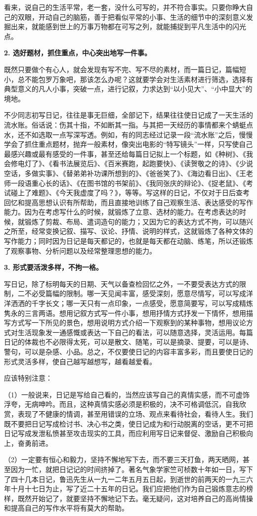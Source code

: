 看来，说自己的生活平常，老一套，没什么可写的，并不符合事实。只要你睁大自己的双眼，开动自己的脑筋，善于把看似平常的小事、生活的细节中的深刻意义发掘出来，就能感到世上的万事万物都在可写之列，就能捕捉到平凡生活中的闪光点。

\textbf{2. 选好题材，抓住重点，中心突出地写一件事。}

既然只要做个有心人，就会发现有写不完、写不尽的素材，而一篇日记，篇幅短小，总不能包罗万象吧，那该怎么办呢？这就要学会对生活素材进行筛选，选择有典型意义的凡人小事，突破一点，进行记叙，力求达到“以小见大”、“小中显大”的境地。

不少同志初写日记，往往是事无巨细，全部记下，结果往往使日记成了一天生活的流水账。俗话说：伤其十指，不如断其一指。与其把一天经历的事情都来个蜻蜓点水，还不如选取一点写深写透。例如，有的同志经过记录一段“流水账”之后，慢慢学会了抓住重点题材，抛弃一般素材，像突出电影的“特写镜头”一样，只写使自己最感兴趣或最有感受的一件事，甚至还给每篇日记拟上一个标题，如《种树》、《我会修电灯了》、《看书法展览后》、《百米赛跑，起跑要快》、《读贺敬之的诗》、《少说空话，多做实事》、《替弟弟补功课所想到的》、《爸爸笑了》、《海边看日出》、《王老师一段语重心长的话》、《在图书馆的书架前》、《我同张庆的辩论》、《捉老鼠》、《考试碰上了难题》、《今天我虚度了吗？》，等等。写这样的日记，不仅对于日后查考回忆和提高思想认识有所帮助，而且直接地训练了自己观察生活、表达感受的写作能力。因为在考虑写什么的时候，就锻炼了立意、选材的能力。在考虑表达的时候，就锻炼了剪裁、布局、遣词造句的能力；又因为它的表达方式不拘，可以随兴之所至，经常变换记叙、描写、议论、抒情、说明的样式，这就锻炼了各种文体的写作能力；同时因为日记是每天都记的，也就是每天都在动脑、练笔，所以还锻炼了观察事物、分析问题以及经常整理思想的能力。

\textbf{3. 形式要活泼多样，不拘一格。}

写日记，除了标明每天的日期、天气以备查检回忆之外，一不要受表达方式的限制，二不必受篇幅的限制。哪一天见闻丰富，感受深刻，愿意尽情写，可以写成洋洋洒洒的千字长文；哪一天只有一点印象，一点感受，愿意简要写，可以写成精炼隽永的三言两语。想用记叙方式写一件小事，想用抒情方式抒发一下情怀，想用描写方式写一下所见的景色，想用说明方式介绍一下观察到的某种事物，想用议论方式对生活现象发一通感慨或表达一下自己的看法，可以随意选择，灵活运用。每篇日记的体裁也不必限得太死，可以是散文、随笔，可以是摘录、提要，可以是诗、警句，可以是杂感、小品。总之，不仅要使日记的内容丰富多彩，而且要使日记的形式灵活多样，使自己越写越想写，越看越爱看。

应该特别注意：

（1）一般说来，日记是写给自己看的，当然应该写自己的真情实感，而不可虚饰浮夸，无病呻吟。而且，这种真情实感必须是积极的，决不可格调低沉，自我欣赏，表现了不健康的情调，甚至用错误的立场、观点来看待社会，看待人生。我们既不要把日记写成检讨书、决心书之类，使日记成为和行动脱离的空话，更不可把日记写成发泄私愤甚至攻击现实的工具，而应利用写日记来督促、激励自己积极向上，奋勇前进。

（2）一定要有恒心和毅力，坚持不懈地写下去，而不要三天打鱼，两天晒网，甚至因为一忙，就把日记记的时间挤掉了。著名气象学家竺可桢数十年如一日，写下了四十几本日记，鲁迅先生从一九一二年五月五日起，到逝世的前两天的一九三六年十月十七日为止，写了近二十五年的日记。我们应把他们作为自己锻炼意志的榜样，既然开始记了，就要坚持不懈地记下去。毫无疑问，这对培养自己的高尚情操和提高自己的写作水平将有莫大的帮助。
\newpage